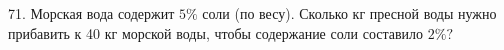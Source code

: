 71. Морская вода содержит $5\%$ соли (по весу). Сколько кг пресной воды нужно прибавить к 40 кг морской воды, чтобы содержание соли составило $2\%?$\\
